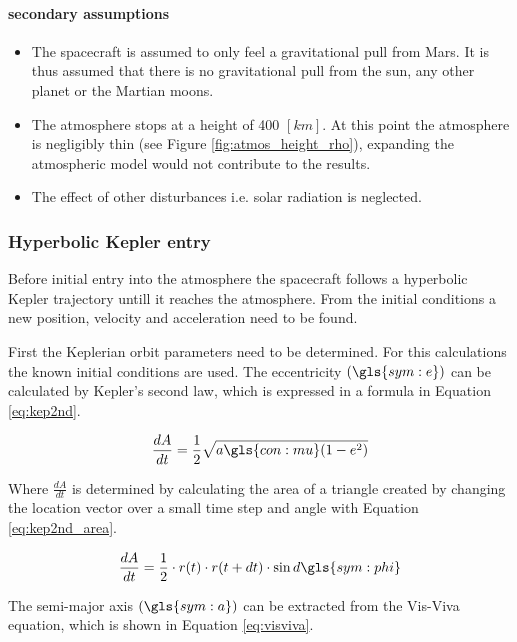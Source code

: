  
 \paragraph{secondary assumptions}
 \begin{itemize}
 \item The spacecraft is assumed to only feel a gravitational pull from Mars. It is thus assumed that there is no gravitational pull from the sun, any other planet or the Martian moons.
 \item The atmosphere stops at a height of 400 $\left[km\right]$. At this point the atmosphere is negligibly thin (see Figure \ref{fig:atmos_height_rho}),  expanding the atmospheric model would not contribute to the results.
 \item The effect of other disturbances i.e. solar radiation is neglected.

 \end{itemize}
 
\subsubsection{Hyperbolic Kepler entry}
 \label{sec:hypkep}
Before initial entry into the atmosphere the spacecraft follows a hyperbolic Kepler trajectory untill it reaches the atmosphere. From the initial conditions a new position, velocity and acceleration need to be found. 

First the Keplerian orbit parameters need to be determined. For this calculations the known initial conditions are used. The eccentricity $\left(\gls{sym:e}\right)$ can be calculated by Kepler's second law, which is expressed in a formula in Equation \ref{eq:kep2nd}.

\begin{equation}
\frac{dA}{dt} = \frac{1}{2}\sqrt{a\gls{con:mu}(1-e^2)}
\label{eq:kep2nd}
\end{equation}

Where $\frac{dA}{dt}$ is determined by calculating the area of a triangle created by changing the location vector over a small time step and angle with Equation \ref{eq:kep2nd_area}.

\begin{equation}
\frac{dA}{dt} = \frac{1}{2} \cdot r(t) \cdot r(t+dt) \cdot \sin{d\gls{sym:phi}}
\label{eq:kep2nd_area}
\end{equation}

The semi-major axis $\left(\gls{sym:a}\right)$ can be extracted from the Vis-Viva equation, which is shown in Equation \ref{eq:visviva}.

